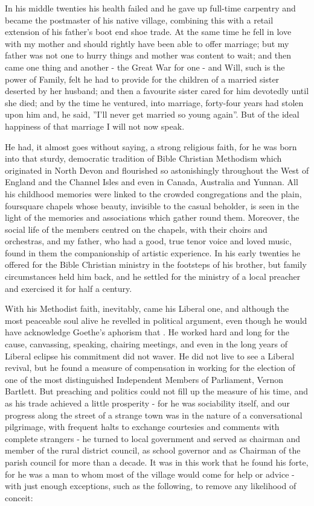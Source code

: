 In his middle twenties his health failed and he gave up full-time carpentry and became the postmaster of his native village, combining this with a retail extension of his father’s boot end shoe trade. At the same time he fell in love with my mother and should rightly have been able to offer marriage; but my father was not one to hurry things and mother was content to wait; and then came one thing and another - the Great War for one - and Will, such is the power of Family, felt he had to provide for the children of a married sister deserted by her husband; and then a favourite sister cared for him devotedly until she died; and by the time he ventured, into marriage, forty-four years had stolen upon him and, he said, ”I’ll never get married so young again”. But of the ideal happiness of that marriage I will not now speak.

He had, it almost goes without saying, a strong religious faith, for he was born into that sturdy, democratic tradition of Bible Christian Methodism which originated in North Devon and flourished so astonishingly throughout the West of England and the Channel Isles and even in Canada, Australia and Yunnan. All his childhood memories were linked to the crowded congregations and the plain, foursquare chapels whose beauty, invisible to the casual beholder, is seen in the light of the memories and associations which gather round them. Moreover, the social life of the members centred on the chapels, with their choirs and orchestras, and my father, who had a good, true tenor voice and loved music, found in them the companionship of artistic experience. In his early twenties he offered for the Bible Christian ministry in the footsteps of his brother, but family circumstances held him back, and he settled for the ministry of a local preacher and exercised it for half a century.


With his Methodist faith, inevitably, came his Liberal one, and although the most peaceable soul alive he revelled in political argument, even though he would have acknowledge Goethe’s aphorism that . He worked hard and long for the cause, canvassing, speaking, chairing meetings, and even in the long years of Liberal eclipse his commitment did not waver. He did not live to see a Liberal revival, but he found a measure of compensation in working for the election of one of the most distinguished Independent Members of Parliament, Vernon Bartlett. But preaching and politics could not fill up the measure of his time, and as his trade achieved a little prosperity - for he was sociability itself, and our progress along the street of a strange town was in the nature of a conversational pilgrimage, with frequent halts to exchange courtesies and comments with complete strangers - he turned to local government and served as chairman and member of the rural district council, as school governor and as Chairman of the parish council for more than a decade. It was in this work that he found his forte, for he was a man to whom most of the village would come for help or advice - with just enough exceptions, such as the following, to remove any likelihood of conceit:

